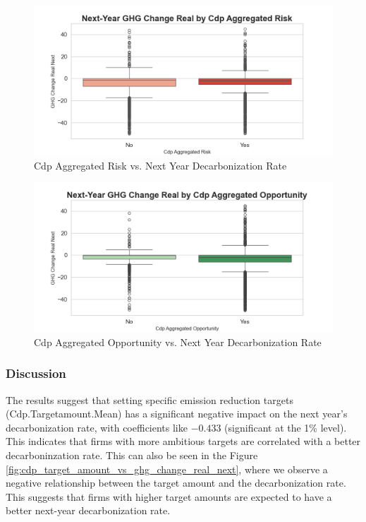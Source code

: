 \begin{figure}[H]
\centering
  \includegraphics[width=\textwidth]{figures/ghg_change_real_next_by_cdp_aggregated_risk.png}
\caption{Cdp Aggregated Risk vs. Next Year Decarbonization Rate}
\label{fig:ghg_change_real_next_by_cdp_aggregated_risk}
\end{figure}

\begin{figure}[H]
\centering
  \includegraphics[width=\textwidth]{figures/ghg_change_real_next_by_cdp_aggregated_opportunity.png}
\caption{Cdp Aggregated Opportunity vs. Next Year Decarbonization Rate}
\label{fig:ghg_change_real_next_by_cdp_aggregated_opportunity}
\end{figure}


\subsubsection{Discussion}
The results suggest that setting specific emission reduction targets \\(Cdp.Targetamount.Mean) has a significant negative impact on the next year's decarbonization rate, with coefficients like $-0.433$ (significant at the 1\% level). This indicates that firms with more ambitious targets are correlated with a better decarboninzation rate. This can also be seen in the Figure \ref{fig:cdp_target_amount_vs_ghg_change_real_next}, where we observe a negative relationship between the target amount and the decarbonization rate. This suggests that firms with higher target amounts are expected to have a better next-year decarbonization rate. 


